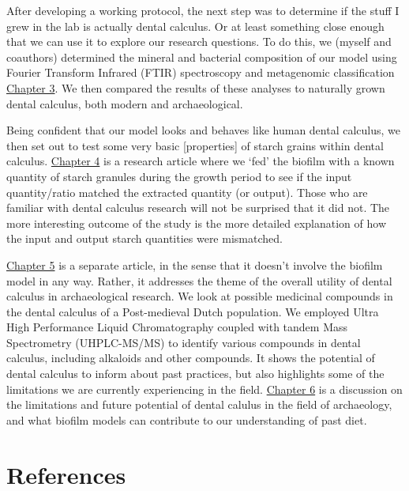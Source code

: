 \documentclass[
  letterpaper,
]{book}
\begin{document}
After developing a working protocol, the next step was to determine if
the stuff I grew in the lab is actually dental calculus. Or at least
something close enough that we can use it to explore our research
questions. To do this, we (myself and coauthors) determined the mineral
and bacterial composition of our model using Fourier Transform Infrared
(FTIR) spectroscopy and metagenomic classification
\protect\hyperlink{byoc-valid}{Chapter 3}. We then compared the results
of these analyses to naturally grown dental calculus, both modern and
archaeological.

Being confident that our model looks and behaves like human dental
calculus, we then set out to test some very basic {[}properties{]} of
starch grains within dental calculus.
\protect\hyperlink{byoc-starch}{Chapter 4} is a research article where
we `fed' the biofilm with a known quantity of starch granules during the
growth period to see if the input quantity/ratio matched the extracted
quantity (or output). Those who are familiar with dental calculus
research will not be surprised that it did not. The more interesting
outcome of the study is the more detailed explanation of how the input
and output starch quantities were mismatched.

\protect\hyperlink{mb11CalculusPilot}{Chapter 5} is a separate article,
in the sense that it doesn't involve the biofilm model in any way.
Rather, it addresses the theme of the overall utility of dental calculus
in archaeological research. We look at possible medicinal compounds in
the dental calculus of a Post-medieval Dutch population. We employed
Ultra High Performance Liquid Chromatography coupled with tandem Mass
Spectrometry (UHPLC-MS/MS) to identify various compounds in dental
calculus, including alkaloids and other compounds. It shows the
potential of dental calculus to inform about past practices, but also
highlights some of the limitations we are currently experiencing in the
field. \protect\hyperlink{chap-discussion}{Chapter 6} is a discussion on
the limitations and future potential of dental calulus in the field of
archaeology, and what biofilm models can contribute to our understanding
of past diet.

\hypertarget{references}{%
\section*{References}\label{references}}

\end{document}
